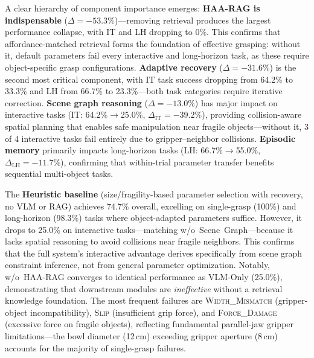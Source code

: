 \documentclass[letterpaper, 10pt, conference]{ieeeconf}
\begin{document}
A clear hierarchy of component importance emerges:
\textbf{HAA-RAG is indispensable} ($\Delta = -53.3\%$)---removing retrieval produces the largest performance collapse, with IT and LH dropping to 0\%.
This confirms that affordance-matched retrieval forms the foundation of effective grasping: without it, default parameters fail every interactive and long-horizon task, as these require object-specific grasp configurations.
\textbf{Adaptive recovery} ($\Delta = -31.6\%$) is the second most critical component, with IT task success dropping from 64.2\% to 33.3\% and LH from 66.7\% to 23.3\%---both task categories require iterative correction.
\textbf{Scene graph reasoning} ($\Delta = -13.0\%$) has major impact on interactive tasks (IT: 64.2\%$\to$25.0\%, $\Delta_{\text{IT}} = -39.2\%$), providing collision-aware spatial planning that enables safe manipulation near fragile objects---without it, 3 of 4 interactive tasks fail entirely due to gripper--neighbor collisions.
\textbf{Episodic memory} primarily impacts long-horizon tasks (LH: 66.7\%$\to$55.0\%, $\Delta_{\text{LH}} = -11.7\%$), confirming that within-trial parameter transfer benefits sequential multi-object tasks.

The \textbf{Heuristic baseline} (size/fragility-based parameter selection with recovery, no VLM or RAG) achieves 74.7\% overall, excelling on single-grasp (100\%) and long-horizon (98.3\%) tasks where object-adapted parameters suffice.
However, it drops to 25.0\% on interactive tasks---matching w/o~Scene~Graph---because it lacks spatial reasoning to avoid collisions near fragile neighbors.
This confirms that the full system's interactive advantage derives specifically from scene graph constraint inference, not from general parameter optimization.
Notably, w/o~HAA-RAG converges to identical performance as VLM-Only (25.0\%), demonstrating that downstream modules are \emph{ineffective} without a retrieval knowledge foundation.
The most frequent failures are \textsc{Width\_Mismatch} (gripper-object incompatibility), \textsc{Slip} (insufficient grip force), and \textsc{Force\_Damage} (excessive force on fragile objects), reflecting fundamental parallel-jaw gripper limitations---the bowl diameter (12\,cm) exceeding gripper aperture (8\,cm) accounts for the majority of single-grasp failures.
\end{document}
